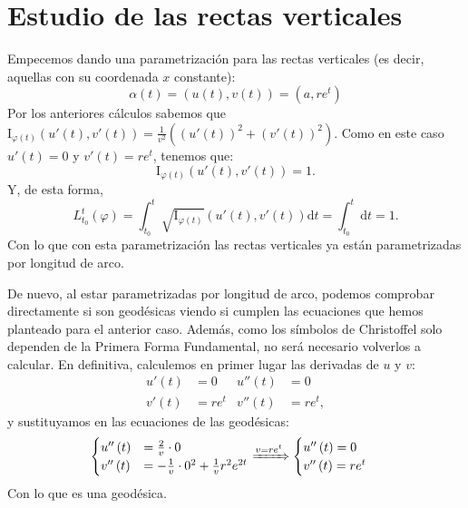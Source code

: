 \section{Estudio de las rectas verticales}
Empecemos dando una parametrización para las rectas verticales (es decir,
aquellas con su coordenada $x$ constante):
\[
\alpha\left( t \right) = \left( u\left( t \right), v\left( t \right) \right) =
\left( a, re^t \right)
\]
Por los anteriores cálculos sabemos que $\mathrm{I}_{\varphi\left( t
\right)}\left( u'\left( t \right), v'\left( t \right) \right) =
\frac{1}{v^2}\left( \left( u'\left( t \right) \right)^2 + \left( v'\left( t
\right) \right)^2 \right)$. Como en este caso $u'\left( t \right) = 0$ y
$v'\left( t \right) = r e^t$, tenemos que:
\[
\mathrm{I}_{\varphi\left( t \right)} \left( u'\left( t \right), v'\left( t
\right) \right) = 1.
\]
Y, de esta forma,
\[
L_{t_0}^t \left( \varphi \right) = \int_{t_0}^{t}
\sqrt{\mathrm{I}_{\varphi\left( t \right)}} \left( u'\left( t \right), v'\left(
t \right) \right) \mathrm{d}t = \int_{t_0}^{t} \mathrm{d}t = 1.
\]
Con lo que con esta parametrización las rectas verticales ya están
parametrizadas por longitud de arco.

De nuevo, al estar parametrizadas por longitud de arco, podemos comprobar
directamente si son geodésicas viendo si cumplen las ecuaciones que hemos
planteado para el anterior caso. Además, como los símbolos de Christoffel solo
dependen de la Primera Forma Fundamental, no será necesario volverlos a
calcular. En definitiva, calculemos en primer lugar las derivadas de $u$ y $v$:
\begin{align*}
    u'\left( t \right) &= 0 & u''\left( t \right) &= 0\\
    v'\left( t \right) &= r e^t & v''\left( t \right) &= re^t,
\end{align*}
y sustituyamos en las ecuaciones de las geodésicas:
\[
\begin{cases}
    u''\left( t \right) &= \frac{2}{v} \cdot 0\\
    v''\left( t \right) &= - \frac{1}{v} \cdot 0^2 + \frac{1}{v} r^2 e^{2t} 
\end{cases} \xRightarrow{v = re^t} \begin{cases}
    u''\left( t \right) = 0\\
    v''\left( t \right) = re^t
\end{cases}
\]
Con lo que es una geodésica.
